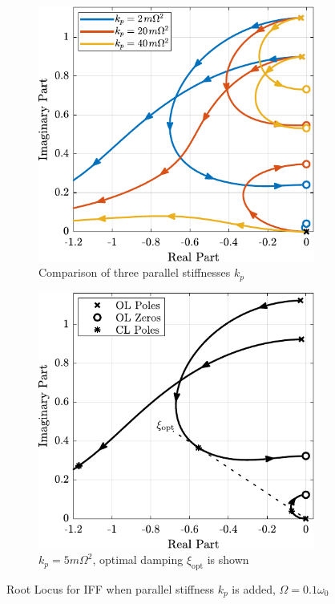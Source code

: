 \documentclass{ISMA_USD2020}
\begin{document}
\begin{figure}[htbp]
\begin{subfigure}[c]{0.45\linewidth}
\includegraphics[width=\linewidth]{figs/root_locus_iff_kps.pdf}
\caption{\label{fig:root_locus_iff_kps} Comparison of three parallel stiffnesses \(k_p\)}
\end{subfigure}
\hfill
\begin{subfigure}[c]{0.45\linewidth}
\includegraphics[width=\linewidth]{figs/root_locus_opt_gain_iff_kp.pdf}
\caption{\label{fig:root_locus_opt_gain_iff_kp} \(k_p = 5 m \Omega^2\), optimal damping \(\xi_\text{opt}\) is shown}
\end{subfigure}
\hfill
\caption{\label{fig:root_locus_iff_kps_opt}Root Locus for IFF when parallel stiffness \(k_p\) is added, \(\Omega = 0.1 \omega_0\)}
\centering
\end{figure}
\end{document}
